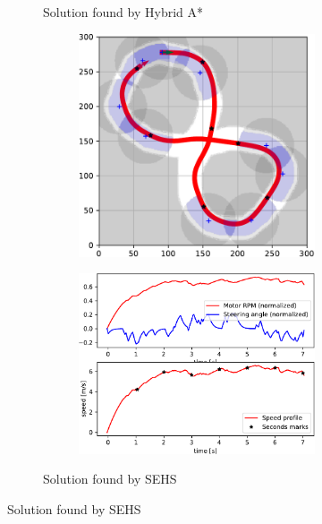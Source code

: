 \begin{figure}[!tbp]
\begin{subfigure}[t]{\textwidth}
\begin{subfigure}[t]{0.45\textwidth}
		\end{subfigure}
		\caption{Solution found by Hybrid A*}
		\label{fig:eight-hybrid_astar}
	\end{subfigure}
	
	\vspace{0.75cm}
	
	\begin{subfigure}[t]{\textwidth}
		\begin{subfigure}[t]{0.45\textwidth}
			\includegraphics[width=\textwidth]{../img/experiments/eight-sehs-trajectory}
		\end{subfigure}
		\hfill
		\begin{subfigure}[t]{0.45\textwidth}
			\includegraphics[width=\textwidth]{../img/experiments/eight-sehs-actuators}
		\end{subfigure}
		\caption{Solution found by SEHS}
		\label{fig:eight-sehs}
	\end{subfigure}


\end{figure}
